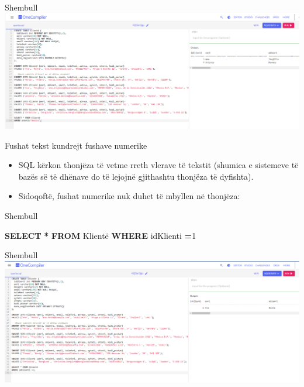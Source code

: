 \documentclass[
  ignorenonframetext,
]{beamer}
\newenvironment{Shaded}{\begin{snugshade}}{\end{snugshade}}
\newcommand{\DecValTok}[1]{\textcolor[rgb]{0.00,0.00,0.81}{#1}}
\newcommand{\KeywordTok}[1]{\textcolor[rgb]{0.13,0.29,0.53}{\textbf{#1}}}
\newcommand{\NormalTok}[1]{#1}
\newcommand{\OperatorTok}[1]{\textcolor[rgb]{0.81,0.36,0.00}{\textbf{#1}}}
\begin{document}
\begin{frame}{Shembull}
\label{shembull-2}
\includegraphics{./Figs/query6.png}
\end{frame}

\begin{frame}{Fushat tekst kundrejt fushave numerike}
\label{fushat-tekst-kundrejt-fushave-numerike}
\begin{itemize}
\item
  SQL kërkon thonjëza të vetme rreth vlerave të tekstit (shumica e
  sistemeve të bazës së të dhënave do të lejojnë gjithashtu thonjëza të
  dyfishta).
\item
  Sidoqoftë, fushat numerike nuk duhet të mbyllen në thonjëza:
\end{itemize}
\end{frame}

\begin{frame}[fragile]{Shembull}
\label{shembull-3}
\begin{Shaded}
\begin{Highlighting}[]
\KeywordTok{SELECT} \OperatorTok{*} \KeywordTok{FROM}\NormalTok{ Klientë}
\KeywordTok{WHERE}\NormalTok{ idKlienti }\OperatorTok{=}\DecValTok{1}
\end{Highlighting}
\end{Shaded}
\end{frame}

\begin{frame}{Shembull}
\label{shembull-4}
\includegraphics{./Figs/query7.png}
\end{frame}
\end{document}
